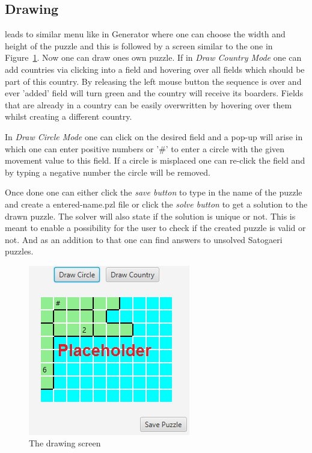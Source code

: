 \subsection{Drawing} leads to similar menu like in Generator where one can choose the width and height of the puzzle and this is followed by a screen similar to the one in Figure~\ref{fig:drawing_screen}.
Now one can draw ones own puzzle. If in \emph{Draw Country Mode} one can add countries via clicking into a field and hovering over all fields which should be part of this country. By releasing the left mouse button the sequence is over and ever 'added' field will turn green and the country will receive its boarders. Fields that are already in a country can be easily overwritten by hovering over them whilst creating a different country.

In \emph{Draw Circle Mode} one can click on the desired field and a pop-up will arise in which one can enter positive numbers or '\#' to enter a circle with the given movement value to this field. If a circle is misplaced one can re-click the field and by typing a negative number the circle will be removed.

Once done one can either click the \emph{save button} to type in the name of the puzzle and create a entered-name.pzl file or click the \emph{solve button} to get a solution to the drawn puzzle. The solver will also state if the solution is unique or not. This is meant to enable a possibility for the user to check if the created puzzle is valid or not. And as an addition to that one can find answers to unsolved Satogaeri puzzles.
\begin{figure}
  \centering
  \includegraphics[scale=1]{Pictures/drawing_screen.png} 
  \caption{The drawing screen}
  \label{fig:drawing_screen}
\end{figure}

